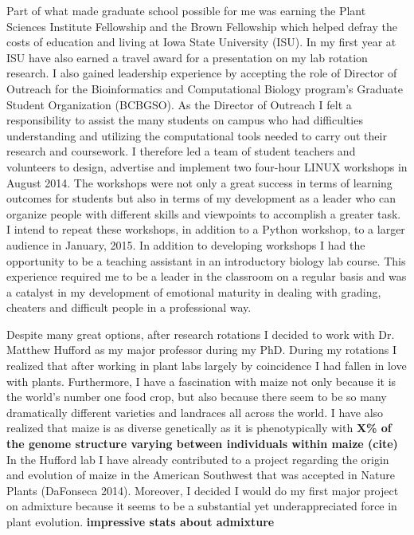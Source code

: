 \documentclass[12pt]{amsart}
\begin{document}
Part of what made graduate school possible for me was earning the Plant Sciences Institute Fellowship and the Brown Fellowship which helped defray the costs of education and living at Iowa State University (ISU).  
In my first year at ISU have also earned a travel award for a presentation on my lab rotation research.
I also gained leadership experience by accepting the role of Director of Outreach for the Bioinformatics and Computational Biology program's Graduate Student Organization (BCBGSO).
As the Director of Outreach I felt a responsibility to assist the many students on campus who had difficulties understanding and utilizing the computational tools needed to carry out their research and coursework.
I therefore led a team of student teachers and volunteers to design, advertise and implement two four-hour LINUX workshops in August 2014.
The workshops were not only a great success in terms of learning outcomes for students but also in terms of my development as a leader who can organize people with different skills and viewpoints to accomplish a greater task.
I intend to repeat these workshops, in addition to a Python workshop, to a larger audience in January, 2015.
In addition to developing workshops I had the opportunity to be a teaching assistant in an introductory biology lab course.
This experience required me to be a leader in the classroom on a regular basis and was a catalyst in my development of emotional maturity in dealing with grading, cheaters and difficult people in a professional way.

Despite many great options, after research rotations I decided to work with Dr. Matthew Hufford as my major professor during my PhD.
During my rotations I realized that after working in plant labs largely by coincidence I had fallen in love with plants.
Furthermore, I have a fascination with maize not only because it is the world's number one food crop, but also because there seem to be so many dramatically different varieties and landraces all across the world.
I have also realized that maize is as diverse genetically as it is phenotypically with \textbf{X\% of the genome structure varying between individuals within maize (cite)}
In the Hufford lab I have already contributed to a project regarding the origin and evolution of maize in the American Southwest that was accepted in Nature Plants (DaFonseca 2014).
Moreover, I decided I would do my first major project on admixture because it seems to be a substantial yet underappreciated force in plant evolution.
\textbf{impressive stats about admixture} 
\end{document}
